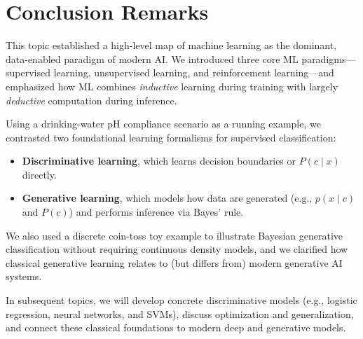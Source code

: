 \documentclass[12pt]{article}
\begin{document}
\section{Conclusion Remarks}
This topic established a high-level map of machine learning as the dominant, data-enabled paradigm of modern AI. We introduced three core ML paradigms—supervised learning, unsupervised learning, and reinforcement learning—and emphasized how ML combines \emph{inductive} learning during training with largely \emph{deductive} computation during inference.

Using a drinking-water pH compliance scenario as a running example, we contrasted two foundational learning formalisms for supervised classification:
\begin{itemize}
\item \textbf{Discriminative learning}, which learns decision boundaries or $P(c\mid x)$ directly.
\item \textbf{Generative learning}, which models how data are generated (e.g., $p(x\mid c)$ and $P(c)$) and performs inference via Bayes' rule.
\end{itemize}

We also used a discrete coin-toss toy example to illustrate Bayesian generative classification without requiring continuous density models, and we clarified how classical generative learning relates to (but differs from) modern generative AI systems.

In subsequent topics, we will develop concrete discriminative models (e.g., logistic regression, neural networks, and SVMs), discuss optimization and generalization, and connect these classical foundations to modern deep and generative models.
\end{document}
